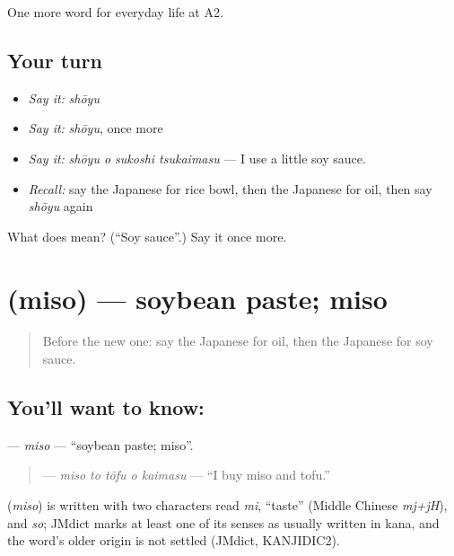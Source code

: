 \begin{grammarlens}[title={What you've built}]
One more word for everyday life at A2.
\end{grammarlens}

\subsection*{Your turn}
\begin{itemize}
\raggedright
  \item \emph{Say it:} \emph{shōyu}
  \item \emph{Say it:} \emph{shōyu}, once more
  \item \emph{Say it:} \emph{shōyu o sukoshi tsukaimasu} — I use a little soy sauce.
  \item \emph{Recall:} say the Japanese for rice bowl, then the Japanese for oil, then say \emph{shōyu} again
\end{itemize}

\begin{tcolorbox}[breakable,colback=teal!4,colframe=teal!35!black,title={Before you move on}]
What does  mean? (\textquotedblleft{}Soy sauce\textquotedblright{}.) Say it once more.
\end{tcolorbox}
\section[\texorpdfstring{\ja{みそ} (miso)}{みそ (miso)}]{ (miso) — soybean paste; miso}

\label{lesson:JA-C176-miso}



\begin{quote}
Before the new one: say the Japanese for oil, then the Japanese for soy sauce.
\end{quote}

\subsection*{You'll want to know: }
\textbf{} — \emph{miso} — \textquotedblleft{}soybean paste; miso\textquotedblright{}.

\begin{quote}
\textbf{  } — \emph{miso to tōfu o kaimasu} — \textquotedblleft{}I buy miso and tofu.\textquotedblright{}
\end{quote}

\begin{cousinweb}
\textbf{} (\emph{miso}) is written with two characters read \emph{mi}, \textquotedblleft{}taste\textquotedblright{} (Middle Chinese \emph{mj+jH}), and \emph{so}; JMdict marks at least one of its senses as usually written in kana, and the word's older origin is not settled (JMdict, KANJIDIC2).
\end{cousinweb}

